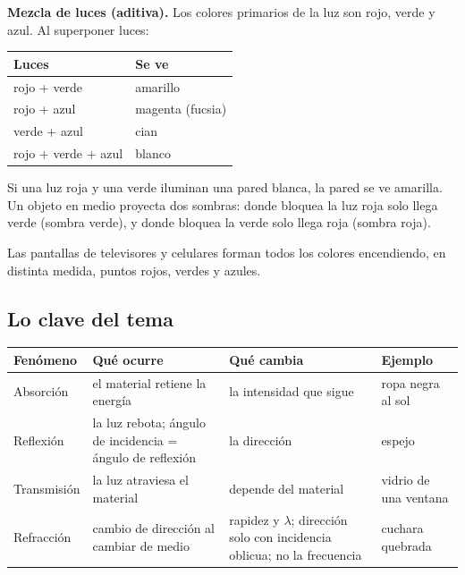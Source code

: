 \textbf{Mezcla de luces (aditiva).} Los colores primarios de la luz son rojo, verde y azul. Al superponer luces:

 
\begin{center}\small
\begin{tabular}{@{}ll@{}}
\toprule
\textbf{Luces} & \textbf{Se ve} \\
\midrule
rojo + verde & amarillo \\
rojo + azul & magenta (fucsia) \\
verde + azul & cian \\
rojo + verde + azul & blanco \\
\bottomrule
\end{tabular}
\end{center}
  
\begin{clave} Si una luz roja y una verde iluminan una pared blanca, la pared se ve amarilla. Un objeto en medio proyecta dos sombras: donde bloquea la luz roja solo llega verde (sombra verde), y donde bloquea la verde solo llega roja (sombra roja).\end{clave}
 
\begin{clave}[{Recuerda}] Las pantallas de televisores y celulares forman todos los colores encendiendo, en distinta medida, puntos rojos, verdes y azules.\end{clave}
\subsection{Lo clave del tema}
\begin{center}\small
\begin{tabularx}{\linewidth}{@{}>{\raggedright\arraybackslash\hsize=0.49\hsize}X>{\raggedright\arraybackslash\hsize=1.39\hsize}X>{\raggedright\arraybackslash\hsize=1.39\hsize}X>{\raggedright\arraybackslash\hsize=0.73\hsize}X@{}}
\toprule
\textbf{Fenómeno} & \textbf{Qué ocurre} & \textbf{Qué cambia} & \textbf{Ejemplo} \\
\midrule
Absorción & el material retiene la energía & la intensidad que sigue & ropa negra al sol \\
Reflexión & la luz rebota; ángulo de incidencia = ángulo de reflexión & la dirección & espejo \\
Transmisión & la luz atraviesa el material & depende del material & vidrio de una ventana \\
Refracción & cambio de dirección al cambiar de medio & rapidez y $\lambda$; dirección solo con incidencia oblicua; no la frecuencia & cuchara quebrada \\
\bottomrule
\end{tabularx}
\end{center}
 
